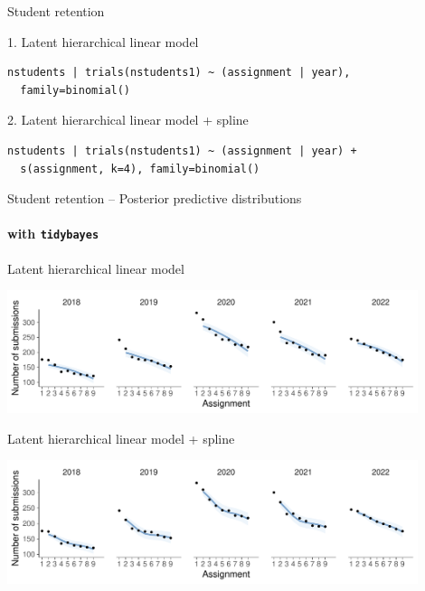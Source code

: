 \documentclass[t]{beamer}
\begin{document}
\begin{frame}[fragile]{Student retention}

1. Latent hierarchical linear model
{\footnotesize
\begin{lstlisting}
nstudents | trials(nstudents1) ~ (assignment | year),
  family=binomial()
\end{lstlisting}}

2. Latent hierarchical linear model + spline
{\footnotesize
\begin{lstlisting}
nstudents | trials(nstudents1) ~ (assignment | year) +
  s(assignment, k=4), family=binomial()
\end{lstlisting}}
  
\end{frame}

\begin{frame}[fragile]{Student retention -- Posterior predictive distributions}
\framesubtitle{with \texttt{tidybayes}}
  
\vspace{-0.75\baselineskip}  
Latent hierarchical linear model\\  
  \hspace{-7mm}
  \begin{minipage}[t][3.6cm][t]{1.0\linewidth}
    \includegraphics[height=3.6cm]{student_retention_lbinom_preds.pdf}
  \end{minipage}
  
\vspace{-0.25\baselineskip}  
Latent hierarchical linear model + spline\\  
  \hspace{-7mm}
  \begin{minipage}[t][3.6cm][t]{1.0\linewidth}
  \includegraphics[height=3.6cm]{student_retention_sbinom_preds.pdf}
  \end{minipage}  

\end{frame}
\end{document}
